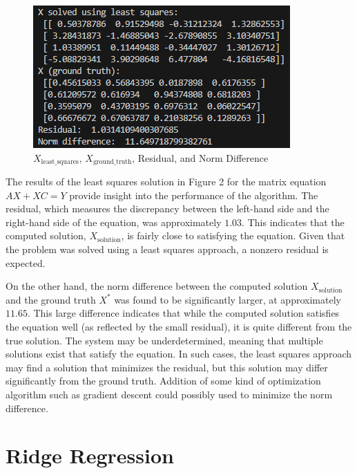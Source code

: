 \documentclass{article}
\begin{document}
\begin{figure}[htbp]
    \centering
    \includegraphics[width=\textwidth]{sln_figures/fig2.png}
    \caption{$X_{\text{least\_squares}}$, $X_{\text{ground\_truth}}$, Residual, and Norm Difference}
\end{figure}
\FloatBarrier

The results of the least squares solution in Figure 2 for the matrix equation \( A X + X C = Y \) provide insight into the performance of the algorithm. The residual, which measures the discrepancy between the left-hand side and the right-hand side of the equation, was approximately \( 1.03 \). This indicates that the computed solution, \( X_{\text{solution}} \), is fairly close to satisfying the equation. Given that the problem was solved using a least squares approach, a nonzero residual is expected. 

On the other hand, the norm difference between the computed solution \( X_{\text{solution}} \) and the ground truth \( X^* \) was found to be significantly larger, at approximately \( 11.65 \). This large difference indicates that while the computed solution satisfies the equation well (as reflected by the small residual), it is quite different from the true solution. The system may be underdetermined, meaning that multiple solutions exist that satisfy the equation. In such cases, the least squares approach may find a solution that minimizes the residual, but this solution may differ significantly from the ground truth. Addition of some kind of optimization algorithm such as gradient descent could possibly used to minimize the norm difference.

\section{Ridge Regression}
\end{document}
